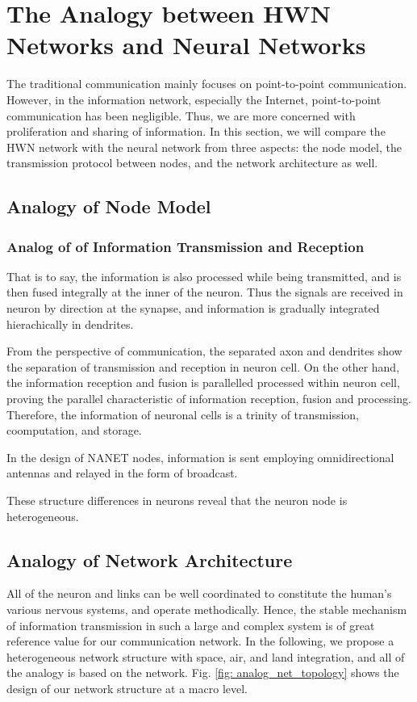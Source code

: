 \documentclass[journal,comsoc]{IEEEtran}
\begin{document}
	\section{The Analogy between HWN Networks and Neural Networks}
	\label{section: analogy}
		The traditional communication mainly focuses on point-to-point communication.
		However, in the information network, especially the Internet, point-to-point communication has been negligible. 
		Thus, we are more concerned with proliferation and sharing of information.
		In this section, we will compare the HWN network with the neural network from three aspects: the node model, the transmission protocol between nodes, and the network architecture as well.
		
		\subsection{Analogy of Node Model}
		\label{subsec: analogy_of_node_model}
			\subsubsection{Analog of of Information Transmission and Reception}
				That is to say, the information is also processed while being transmitted,  and is then fused integrally at the inner of the neuron.
				Thus the signals are received in neuron by direction at the synapse, and information is gradually integrated hierachically in dendrites.	
				
				From the perspective of communication, the separated axon and dendrites show the separation of transmission and reception in neuron cell. 
				On the other hand, the information reception and fusion is parallelled processed within neuron cell, proving the parallel characteristic of information reception, fusion and processing.
				Therefore, the information of neuronal cells is a trinity of transmission, coomputation, and storage.
			
				In the design of NANET nodes, information is sent employing omnidirectional antennas and relayed in the form of broadcast. 
				
				These structure differences in neurons reveal that the neuron node is heterogeneous.
		
		\subsection{Analogy of Network Architecture}
			All of the neuron and links can be well coordinated to constitute the human's various nervous systems, and operate methodically.
		Hence, the stable mechanism of information transmission in such a large and complex system is of great reference value for our communication network.
			In the following, we propose a heterogeneous network structure with space, air, and land integration, and all of the analogy is based on the network.
			Fig. \ref{fig: analog_net_topology} shows the design of our network structure at a macro level.
\end{document}
